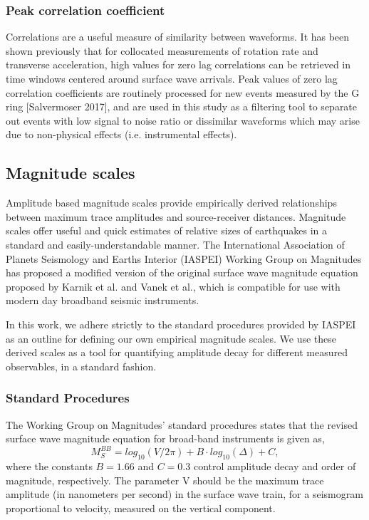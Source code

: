 \documentclass{gji}
\begin{document}
\subsubsection{Peak correlation coefficient}
Correlations are a useful measure of similarity between waveforms. It has been shown previously that for collocated measurements of rotation rate and transverse acceleration, high values for zero lag correlations can be retrieved in time windows centered around surface wave arrivals. %
Peak values of zero lag correlation coefficients are routinely processed for new events measured by the G ring [Salvermoser 2017], %
and are used in this study as a filtering tool to separate out events with low signal to noise ratio or dissimilar waveforms which may arise due to non-physical effects (i.e. instrumental effects). 


\subsection{Magnitude scales}
Amplitude based magnitude scales provide empirically derived relationships between maximum trace amplitudes and source-receiver distances. Magnitude scales offer useful and quick estimates of relative sizes of earthquakes in a standard and easily-understandable manner. 
The International Association of Planets Seismology and Earths Interior (IASPEI) Working Group on Magnitudes has proposed a modified version of the original surface wave magnitude equation proposed by Karnik et al. and Vanek et al., %
which is compatible for use with modern day broadband seismic instruments. 

In this work, we adhere strictly to the standard procedures provided by IASPEI as an outline for defining our own empirical magnitude scales. We use these derived scales as a tool for quantifying amplitude decay for different measured observables, in a standard fashion.

\subsubsection{Standard Procedures}
The Working Group on Magnitudes' standard procedures states that the revised surface wave magnitude equation for broad-band instruments is given as,
\begin{equation}\label{eq:mag}
	M_S^{BB} = log_{10}(V/2\pi) + B\cdot log_{10}(\Delta) + C, 
\end{equation}
where the constants $B=1.66$ and $C=0.3$ control amplitude decay and order of magnitude, respectively. The parameter V should be the maximum trace amplitude (in nanometers per second) in the surface wave train, for a seismogram proportional to velocity, measured on the vertical component. 
\end{document}
